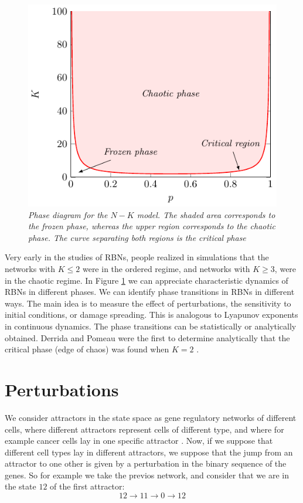 \begin{figure}[h]
\centering
\includegraphics[scale=1]{images/phase-transition.pdf}
\caption{\emph{Phase diagram for the $N-K$ model. The shaded area corresponds
to the frozen phase, whereas the upper region corresponds to the chaotic phase.
The curve separating both regions is the critical phase}}
\label{fig:ph-tr}
\end{figure}

Very early in the studies of
RBNs, people realized in simulations that the networks with
$K \le 2$ were in the ordered regime, and networks with $K \ge 3$,
were in the chaotic regime. In Figure \ref{fig:ph-tr} we can appreciate
characteristic dynamics of RBNs in different phases.
We can identify phase transitions in RBNs in different
ways. The main idea is to measure the effect of perturbations, the sensitivity to initial conditions, or damage spreading. This is analogous to Lyapunov exponents in continuous
dynamics.
The phase transitions can be statistically or analytically
obtained. Derrida and Pomeau were the first to determine
analytically that the critical phase (edge of chaos) was found
when $K = 2$ \cite{K8}.

\section{Perturbations}
We consider attractors in the state space as gene regulatory networks of different cells, where different attractors represent cells of different type, and where for example cancer cells lay in one specific attractor \cite{K3}\cite{K2}.
Now, if we suppose that different cell types lay in different attractors, we  suppose that the jump from an attractor to one other is given by a perturbation in the binary sequence of the genes.
So for example we take the previos network, and consider that we are in the state $12$ of the first attractor:
$$
12 \to 11 \to 0 \to 12
$$

